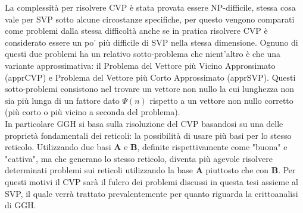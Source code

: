 La complessità per risolvere CVP è stata provata essere NP-difficile\cite{CVP-NP09}, stessa
cosa vale per SVP sotto alcune circostanze specifiche\cite{SVP-NP02}, per questo vengono
comparati come problemi dalla stessa difficoltà anche se in pratica risolvere CVP è considerato 
essere un po' più difficile di SVP nella stessa dimensione. 
Ognuno di questi due problemi ha un relativo sotto-problema che nient'altro è che una 
variante approssimativa: il Problema del Vettore più Vicino Approssimato (apprCVP) 
e Problema del Vettore più Corto Approssimato  (apprSVP). Questi sotto-problemi consistono nel 
trovare un vettore non nullo la cui lunghezza non sia più lunga di un fattore dato $\Psi(n)$
rispetto a un vettore non nullo corretto (più corto o più vicino a seconda del problema).
\\
In particolare GGH si basa sulla risoluzione del CVP basandosi su una delle proprietà
fondamentali dei reticoli: la possibilità di usare più basi per lo stesso reticolo.
Utilizzando due basi $\mathbf{A}$ e $\mathbf{B}$, definite rispettivamente come 
"buona" e "cattiva", ma che generano lo stesso reticolo, diventa più agevole 
risolvere determinati problemi sui reticoli utilizzando la base $\mathbf{A}$ piuttosto 
che con $\mathbf{B}$. 
Per questi motivi il CVP sarà il fulcro dei problemi discussi in questa tesi assieme al SVP,
il quale verrà trattato prevalentemente per quanto riguarda la crittoanalisi di GGH. 